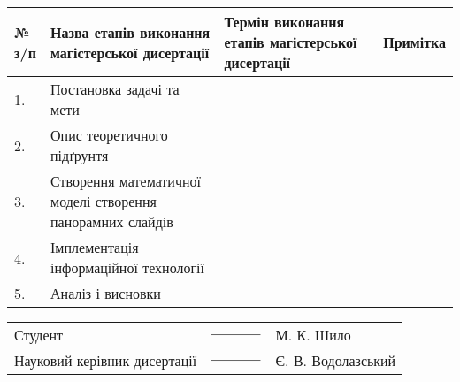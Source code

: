 \begin{table}[H]
    \centering
    \begin{tabular}{|p{0.2in} | p{3in} | p{2.1in} | p{0.9in}|}
        \hline
        № з/п & Назва етапів виконання магістерської дисертації            & Термін виконання етапів магістерської дисертації & Примітка \\
        \hline
        1.    & Постановка задачі та мети                                  &                                                  &          \\
        \hline
        2.    & Опис теоретичного підґрунтя                                &                                                  &          \\
        \hline
        3.    & Створення математичної моделі створення панорамних слайдів &                                                  &          \\
        \hline
        4.    & Імплементація інформаційної технології                     &                                                  &          \\
        \hline
        5.    & Аналіз і висновки                                          &                                                  &          \\
        \hline
    \end{tabular}
\end{table}


\begin{table}[H]
    \centering
    \begin{tabular}{p{3.7in} p{1.2in} p{1.8in}}

        Студент                      & ${\text{\underline{\hspace{4em}}}}$  & М. К. Шило         \\
        Науковий керівник дисертації & ${\text{\underline{\hspace{4em}}}} $ & Є. В. Водолазський
    \end{tabular}
\end{table}

\clearpage

